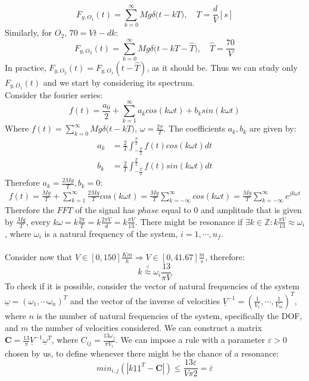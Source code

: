 \documentclass[10pt,a4paper,final]{report}
\begin{document}
$$F_{y,O_{1}}(t) = \sum_{k=0}^{\infty} Mg\delta \big(t-kT\big),\quad T=\frac{d}{V} [s]$$
Similarly, for $O_{2}$, $70=Vt-dk$:
$$F_{y,O_{2}}(t) = \sum_{k=0}^{\infty} Mg\delta \big(t-kT-\hat{T}\big),\quad \hat{T}=\frac{70}{V}$$
In practice, $F_{y,O_{2}}(t) = F_{y,O_{1}}(t-\hat{T})$, as it should be. Thus we can study only $F_{y,O_{1}}(t)$ and we start by considering its spectrum. \\
\newpage
Consider the fourier series:
$$f(t) = \frac{a_0}{2} + \sum_{k=1}^{\infty} a_{k}cos(k\omega t)+b_{k}sin(k \omega t)$$
Where $f(t) =\sum_{k=0}^{\infty} Mg\delta \big(t-kT\big)$, $\omega = \frac{2\pi}{T}$.
The coefficients $a_{k},b_{k}$ are given by:
\begin{align*}
a_{k} &= \frac{2}{T} \int_{-\frac{T}{2}}^{\frac{T}{2}} f(t) cos(k\omega  t) dt \\
b_{k}&= \frac{2}{T} \int_{-\frac{T}{2}}^{\frac{T}{2}} f(t) sin(k\omega  t) dt
\end{align*}
Therefore $a_{k} = \frac{2Mg}{T}, b_{k}=0$:
\begin{align*}
f(t) = \frac{Mg}{T} + \sum_{k=1}^{\infty} \frac{2Mg}{T} cos(k\omega t)=\frac{Mg}{T}\sum_{k=-\infty}^{\infty} cos(k\omega t)=\frac{Mg}{T}\sum_{k=-\infty}^{\infty} e^{jk\omega t}
\end{align*}
Therefore the $FFT$ of the signal has $phase$ equal to $0$ and amplitude that is given by $\frac{Mg}{T}$, every $k\omega = k\frac{2\pi}{T}= k \frac{2\pi V}{d} = k\frac{\pi V}{13}$.
There might be resonance if $\exists k \in \mathbb{Z} : k\frac{\pi V}{13} \approx \omega_{i}$, where $\omega_{i}$ is a natural frequency of the system, $i=1,\cdots,n_{f}$. \\ \\
Consider now that $V \in [0,150] \frac{Km}{h} \Rightarrow V \in [0,41.67] \frac{m}{s}$, therefore:
$$k \stackrel{?}{\approx} \omega_{i} \frac{13}{\pi V}$$
To check if it is possible, consider the vector of natural frequencies of the system $\underline{\omega} = (\omega_{1}, \cdots \omega_{n})^T$ and the vector of the inverse of velocities $\underline{V}^{-1}= (\frac{1}{V_{1}}, \cdots,\frac{1}{V_{m}})^T$, where $n$ is the number of natural frequencies of the system, specifically the DOF, and $m$ the number of velocities considered.
We can construct a matrix $\mathbf{C} = \frac{13}{\pi}\underline{V}^{-1}\underline{\omega}^T$, where $C_{ij} = \frac{13\omega_{j}}{\pi V_{i}}$.
We can impose a rule with a parameter $\varepsilon > 0$ chosen by us, to define whenever there might be the chance of a resonance: $$min_{i,j} (|k\underline{1}\underline{1}^T - \mathbf{C} |)\leq \frac{13\varepsilon }{V\pi 2}=\overline{\varepsilon}$$
\end{document}
